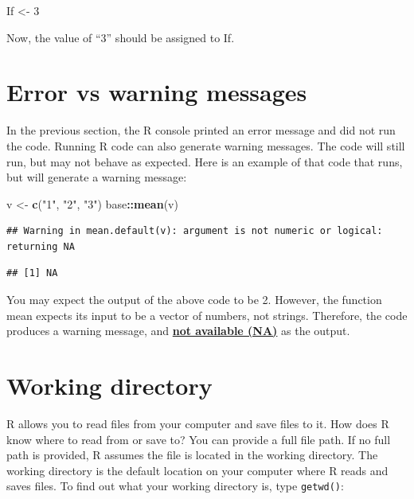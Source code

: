 \documentclass[
]{book}
\newenvironment{Shaded}{\begin{snugshade}}{\end{snugshade}}
\newcommand{\DecValTok}[1]{\textcolor[rgb]{0.00,0.00,0.81}{#1}}
\newcommand{\FunctionTok}[1]{\textcolor[rgb]{0.13,0.29,0.53}{\textbf{#1}}}
\newcommand{\NormalTok}[1]{#1}
\newcommand{\OtherTok}[1]{\textcolor[rgb]{0.56,0.35,0.01}{#1}}
\newcommand{\SpecialCharTok}[1]{\textcolor[rgb]{0.81,0.36,0.00}{\textbf{#1}}}
\newcommand{\StringTok}[1]{\textcolor[rgb]{0.31,0.60,0.02}{#1}}
\begin{document}
\begin{Shaded}
\begin{Highlighting}[]
\NormalTok{If }\OtherTok{\textless{}{-}} \DecValTok{3}
\end{Highlighting}
\end{Shaded}

Now, the value of ``3'' should be assigned to If.

\section{Error vs warning messages}\label{sec:ErrorVsWarning}

In the previous section, the R console printed an error message and did not run the code. Running R code can also generate warning messages. The code will still run, but may not behave as expected. Here is an example of that code that runs, but will generate a warning message:

\begin{Shaded}
\begin{Highlighting}[]
\NormalTok{v }\OtherTok{\textless{}{-}} \FunctionTok{c}\NormalTok{(}\StringTok{"1"}\NormalTok{, }\StringTok{"2"}\NormalTok{, }\StringTok{"3"}\NormalTok{)}
\NormalTok{base}\SpecialCharTok{::}\FunctionTok{mean}\NormalTok{(v)}
\end{Highlighting}
\end{Shaded}

\begin{verbatim}
## Warning in mean.default(v): argument is not numeric or logical: returning NA
\end{verbatim}

\begin{verbatim}
## [1] NA
\end{verbatim}

You may expect the output of the above code to be 2. However, the function mean expects its input to be a vector of numbers, not strings. Therefore, the code produces a warning message, and \textbf{\hyperref[acronyms_NA]{not available (NA)}} as the output.

\section{Working directory}\label{sec:WorkingDirectory}

R allows you to read files from your computer and save files to it. How does R know where to read from or save to? You can provide a full file path. If no full path is provided, R assumes the file is located in the working directory. The working directory is the default location on your computer where R reads and saves files. To find out what your working directory is, type \texttt{getwd()}:
\end{document}
